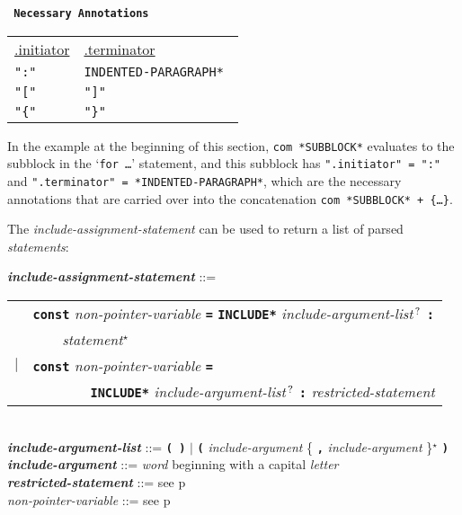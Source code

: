 \documentclass[12pt]{article}
\newcommand{\TT}[1]{{\tt \bfseries #1}}
\newcommand{\STAR}{{\Large $^\star$}}
\newcommand{\QMARK}{{$^{\,\mbox{\footnotesize ?}}$}}
\newcommand{\emkey}[1]{{\em \bfseries #1}}
\newcommand{\pagref}[1]{p\pageref{#1}}
\newenvironment{indpar}[1][0.3in]%
	{\begin{list}{}%
		     {\setlength{\itemsep}{0in}%
		      \setlength{\topsep}{0in}%
		      \setlength{\parsep}{1ex}%
		      \setlength{\labelwidth}{#1}%
		      \setlength{\leftmargin}{#1}%
		      \addtolength{\leftmargin}{\labelsep}}%
	 \item}%
	{\end{list}}
\begin{document}
\begin{center} \tt
{\rm \bf Necessary Annotations}
\\[1ex]
\begin{tabular}{l@{~~~~~~~~~~}l}
\underline{.initiator} & \underline{.terminator}
\\[1ex]
\tt ":" & \tt *INDENTED-PARAGRAPH* \\
\tt "[" & \tt "]" \\
\tt "\{" & \tt "\}" \\
\end{tabular}
\end{center}

In the example at the beginning of this section,
{\tt com *SUBBLOCK*} evaluates to the
subblock in the `{\tt for \ldots}' statement, and this subblock
has {\tt ".initiator" = ":"} and {\tt ".terminator" = *INDENTED-PARA\-GRAPH*},
which are the necessary annotations that are carried over into
the concatenation
{\tt com *SUBBLOCK* + \{\ldots\}}.

The {\em include-assignment-statement} can be used to return a list
of parsed {\em statements}:

\begin{indpar}
\emkey{include-assignment-statement}\label{INCLUDE-ASSIGNMENT-STATEMENT} ::= \\
\hspace*{0.3in}
    \begin{tabular}[t]{rl}
    & \TT{const} {\em non-pointer-variable} \TT{=} \TT{*INCLUDE*}
    	{\em include-argument-list}\QMARK{} \TT{:} \\
    & \TT{~~~~}{\em statement}\STAR{} \\
    $|$ & \TT{const} {\em non-pointer-variable} \TT{=} \\
    & ~~~~~~~~\TT{*INCLUDE*}
    	{\em include-argument-list}\QMARK{} \TT{:}
	{\em restricted-statement} \\
    \end{tabular}
\\[0.5ex]
\emkey{include-argument-list} ::= \TT{( )} $|$
	\TT{(} {\em include-argument}
	\{ \TT{,} {\em include-argument} \}\STAR{} \TT{)}
\\[0.5ex]
\emkey{include-argument} ::= {\em word} beginning with a capital {\em letter}
\\[0.5ex]
\emkey{restricted-statement} ::= see \pagref{RESTRICTED-STATEMENT}
\\[0.5ex]
{\em non-pointer-variable} ::= see \pagref{NON-POINTER-VARIABLE}

\end{indpar}
\end{document}

